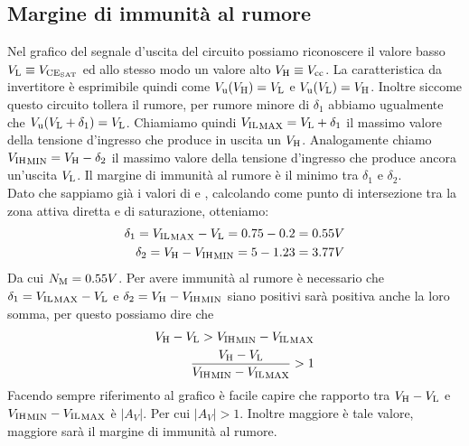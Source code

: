 \documentclass[../template]{subfiles}
\begin{document}
\subsection{Margine di immunità al rumore}
\begin{figure}[h]
    \centering
\end{figure}
\noindent
Nel grafico del segnale d'uscita del circuito possiamo riconoscere il valore basso $V_{\text{L}} \equiv V_{\text{CE}_{\text{SAT}}}$ ed allo stesso modo un valore
alto $V_{\text{H}} \equiv V_{\text{cc}}$.
La caratteristica da invertitore è esprimibile quindi come $V_{\text{u}}(V_{\text{H}}) = V_{\text{L}}$ e $V_{\text{u}}(V_{\text{L}}) = V_{\text{H}}$.
Inoltre siccome questo circuito tollera il rumore, per rumore minore di $\delta_1$ abbiamo ugualmente che $V_{\text{u}}(V_{\text{L}} + \delta_1) = V_{\text{L}}$.
Chiamiamo quindi ${V_{\text{IL}}}_\text{MAX} = V_{\text{L}} + \delta_1$ il massimo valore della tensione d'ingresso che produce in uscita un $V_{\text{H}}$.
Analogamente chiamo ${V_{\text{IH}}}_\text{MIN} = V_{\text{H}} - \delta_2$ il massimo valore della tensione d'ingresso che produce ancora un'uscita $V_{\text{L}}$.
Il margine di immunità al rumore \nm è il minimo tra $\delta_1$ e $\delta_2$.
\\
Dato che sappiamo già i valori di  e , calcolando \vihmin come punto di intersezione tra la zona attiva diretta e di saturazione,
otteniamo:
\begin{align*}
    \delta_1 = {V_{\text{IL}}}_\text{MAX} - V_{\text{L}} = 0.75 - 0.2 = 0.55 V\\
    \delta_2 = V_{\text{H}} - {V_{\text{IH}}}_\text{MIN} = 5 - 1.23 = 3.77V
\end{align*}
Da cui ${N}_\text{M} = 0.55 V$. Per avere immunità al rumore è necessario che $\delta_1 = {V_{\text{IL}}}_\text{MAX} - V_{\text{L}}$ e $\delta_2 = V_{\text{H}} - {V_{\text{IH}}}_\text{MIN}$ siano positivi
sarà positiva anche la loro somma, per questo possiamo dire che
\begin{align*}
    V_{\text{H}} - V_{\text{L}} > {V_{\text{IH}}}_\text{MIN} - {V_{\text{IL}}}_\text{MAX}\\
    \frac{V_{\text{H}} - V_{\text{L}}}{ {V_{\text{IH}}}_\text{MIN} - {V_{\text{IL}}}_\text{MAX}} > 1
\end{align*}
Facendo sempre riferimento al grafico è facile capire che rapporto tra $V_{\text{H}} - V_{\text{L}}$ e ${V_{\text{IH}}}_\text{MIN} - {V_{\text{IL}}}_\text{MAX}$ è $|A_V|$.
Per cui $|A_V| > 1$. Inoltre maggiore è tale valore, maggiore sarà il margine di immunità al rumore.
\end{document}
